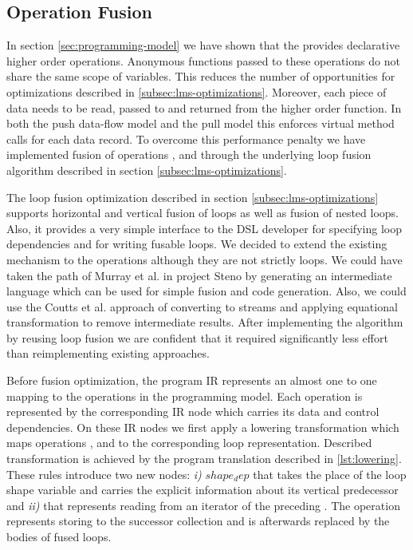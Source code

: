 \subsection{Operation Fusion}
\label{sec:fusion}

In section \ref{sec:programming-model} we have shown that the  provides declarative higher order operations. Anonymous functions passed to these operations do not share the same scope of variables. This reduces the number of opportunities for optimizations described in \ref{subsec:lms-optimizations}. Moreover, each piece of data needs to be read, passed to and returned from the higher order function. In both the push data-flow model and the pull model this enforces virtual method calls \cite{murray_steno:_2011} for each data record. To overcome this performance penalty we have implemented fusion of operations ,  and  through the underlying loop fusion algorithm described in section \ref{subsec:lms-optimizations}. 

The loop fusion optimization described in section \ref{subsec:lms-optimizations} supports horizontal and vertical fusion of loops as well as fusion of nested loops. Also, it provides a very simple interface to the DSL developer for specifying loop dependencies and for writing fusable loops. We decided to extend the existing mechanism to the  operations although they are not strictly loops. We could have taken the path of Murray et al. in project Steno \cite{murray_steno:_2011} by generating an intermediate language which can be used for simple fusion and code generation. Also, we could use the Coutts et al. \cite{coutts_stream_2007} approach of converting  to streams and applying equational transformation to remove intermediate results. After implementing the algorithm by reusing loop fusion we are confident that it required significantly less effort than reimplementing existing approaches.

Before fusion optimization, the program IR represents an almost one to one mapping to the operations in the programming model. Each operation is represented by the corresponding IR node which carries its data and control dependencies. On these IR nodes we first apply a lowering transformation which maps operations ,  and  to the corresponding loop representation. Described transformation is achieved by the program translation described in \ref{lst:lowering}. These rules introduce two new nodes: \emph{i)} $shape_dep$ that takes the place of the loop shape variable and carries the explicit information about its vertical predecessor and \emph{ii)}  that represents reading from an iterator of the preceding . The  operation represents storing to the successor collection and is afterwards replaced by the bodies of fused loops.

